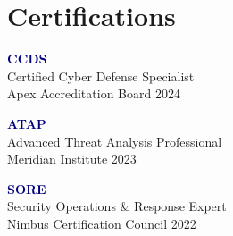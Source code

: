 \documentclass[11pt,a4paper]{article}
\begin{document}
\section{Certifications}

\vspace{4pt}

\noindent
\begin{minipage}{0.325\textwidth}
\begin{tcolorbox}[certbox]
\textbf{\textcolor{navy}{CCDS}}\\[2pt]
{\small Certified Cyber Defense Specialist}\\[1pt]
{\footnotesize\color{mediumgray} Apex Accreditation Board \textbar{} 2024}
\end{tcolorbox}
\end{minipage}\hfill
\begin{minipage}{0.325\textwidth}
\begin{tcolorbox}[certbox]
\textbf{\textcolor{navy}{ATAP}}\\[2pt]
{\small Advanced Threat Analysis Professional}\\[1pt]
{\footnotesize\color{mediumgray} Meridian Institute \textbar{} 2023}
\end{tcolorbox}
\end{minipage}\hfill
\begin{minipage}{0.325\textwidth}
\begin{tcolorbox}[certbox]
\textbf{\textcolor{navy}{SORE}}\\[2pt]
{\small Security Operations \& Response Expert}\\[1pt]
{\footnotesize\color{mediumgray} Nimbus Certification Council \textbar{} 2022}
\end{tcolorbox}
\end{minipage}\par

\vspace{6pt}
\end{document}
